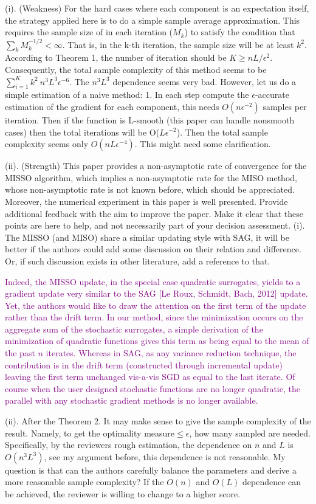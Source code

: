 \documentclass{article} %
\theoremstyle{t}
\begin{document}
(i). (Weakness) For the hard cases where each component is an expectation itself, the strategy applied here is to do a simple sample average approximation. This requires the sample size of in each iteration ($M_k$) to satisfy the condition that $\sum_k M_k^{-1/2}<\infty$. That is, in the k-th iteration, the sample size will be at least $k^2$. According to Theorem 1, the number of iteration should be $K\geq nL/\epsilon^2$. Consequently, the total sample complexity of this method seems to be $ \sum_{i=1}^{K} k^2 ~ n^3L^3\epsilon^{-6}$. The 
$n^3L^3$ dependence seems very bad. However, let us do a simple estimation of a naive method: 1. In each step compute the $\epsilon$-accurate estimation of the gradient for each component, this needs $O(n \epsilon^{-2})$ samples per iteration. Then if the function is L-smooth (this paper can handle nonsmooth cases) then the total iterations will be O($L\epsilon^{-2}$). Then the total sample complexity seems only $O(nL\epsilon^{-4})$. This might need some clarification.
 
(ii). (Strength) This paper provides a non-asymptotic rate of convergence for the MISSO algorithm, which implies a non-asymptotic rate for the MISO method, whose non-asymptotic rate is not known before, which should be appreciated. Moreover, the numerical experiment in this paper is well presented.
Provide additional feedback with the aim to improve the paper. Make it clear that these points are here to help, and not necessarily part of your decision assessment.
(i). The MISSO (and MISO) share a similar updating style with SAG, it will be better if the authors could add some discussion on their relation and difference. Or, if such discussion exists in other literature, add a reference to that.

\textcolor{purple}{
Indeed, the MISSO update, in the special case quadratic surrogates, yields to a gradient update very similar to the SAG [Le Roux, Schmidt, Bach, 2012] update. Yet, the authors would like to draw the attention on the first term of the update rather than the drift term. In our method, since the minimization occurs on the aggregate sum of the stochastic surrogates, a simple derivation of the minimization of quadratic functions gives this term as being equal to the mean of the past $n$ iterates. Whereas in SAG, as any variance reduction technique, the contribution is in the drift term (constructed through incremental update) leaving the first term unchanged vis-a-vis SGD as equal to the last iterate.
Of course when the user designed stochastic functions are no longer quadratic, the parallel with any stochastic gradient methods is no longer available.
}


(ii). After the Theorem 2. It may make sense to give the sample complexity of the result. Namely, to get the optimality measure$ \leq \epsilon$, how many sampled are needed. Specifically, by the reviewers rough estimation, the dependence on $n$ and $L $ is $O(n^3L^3)$, see my argument before, this dependence is not reasonable. My question is that can the authors carefully balance the parameters and derive a more reasonable sample complexity? If the $O(n)$ and $O(L)$ dependence can be achieved, the reviewer is willing to change to a higher score.
\end{document}
